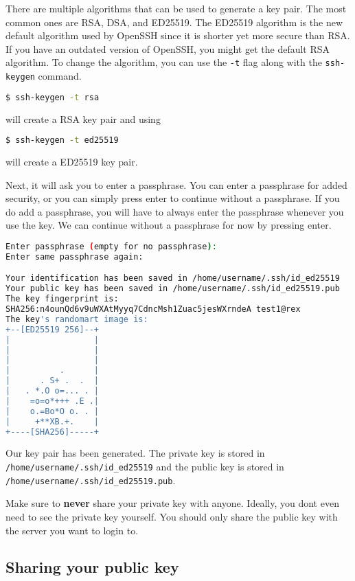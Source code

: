 \begin{remark}
  There are multiple algorithms that can be used
  to generate a key pair. The most common ones are
  RSA, DSA, and ED25519. The ED25519 algorithm is
  the new default algorithm used by OpenSSH since
  it is shorter yet more secure than RSA.
  If you have an outdated version of OpenSSH, you
  might get the default RSA algorithm.
  To change the algorithm, you can use the \texttt{-t}
  flag along with the \texttt{ssh-keygen} command.
  \begin{lstlisting}[language=bash]
  $ ssh-keygen -t rsa \end{lstlisting}
  will create a RSA key pair and using
  \begin{lstlisting}[language=bash]
  $ ssh-keygen -t ed25519 \end{lstlisting}
  will create a ED25519 key pair.
\end{remark}

Next, it will ask you to enter a passphrase.
You can enter a passphrase for added security,
or you can simply press enter to continue without
a passphrase. If you do add a passphrase, you will
have to always enter the passphrase whenever you
use the key. We can continue without a passphrase
for now by pressing enter.

\begin{lstlisting}[language=bash]
Enter passphrase (empty for no passphrase):
Enter same passphrase again:

Your identification has been saved in /home/username/.ssh/id_ed25519
Your public key has been saved in /home/username/.ssh/id_ed25519.pub
The key fingerprint is:
SHA256:n4ounQd6v9uWXAtMyyq7CdncMsh1Zuac5jesWXrndeA test1@rex
The key's randomart image is:
+--[ED25519 256]--+
|                 |
|                 |
|                 |
|          .      |
|      . S+ .  .  |
|   . *.O o=... . |
|    =o=o*+++ .E .|
|    o.=Bo*O o. . |
|     +**XB.+.    |
+----[SHA256]-----+
\end{lstlisting}

Our key pair has been generated. The private key
is stored in \texttt{/home/username/.ssh/id\_ed25519}
and the public key is stored in
\texttt{/home/username/.ssh/id\_ed25519.pub}.

Make sure to \textbf{never} share your private key with anyone.
Ideally, you dont even need to see the private key yourself.
You should only share the public key with the server
you want to login to.

\subsection{Sharing your public key}

